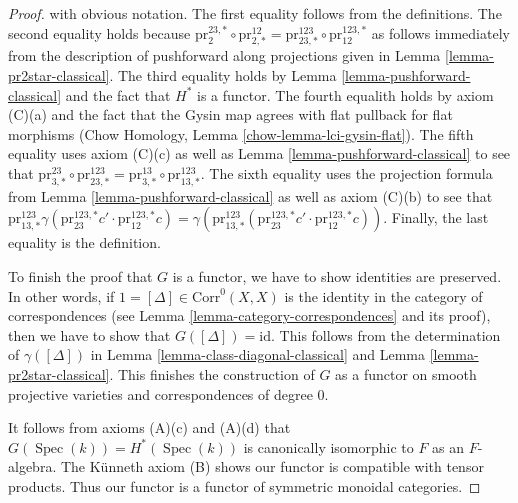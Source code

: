 \documentclass{stacks-project}
\theoremstyle{plain}
\theoremstyle{definition}
\theoremstyle{remark}
\numberwithin{equation}{subsection}
\def\Spec{\mathop{\mathrm{Spec}}}
\begin{document}
\begin{proof}
with obvious notation. The first equality follows from the definitions.
The second equality holds because
$\text{pr}^{23, *}_2 \circ \text{pr}^{12}_{2, *} =
\text{pr}^{123}_{23, *} \circ \text{pr}^{123, *}_{12}$
as follows immediately from the description of pushforward
along projections given in Lemma \ref{lemma-pr2star-classical}.
The third equality holds by Lemma \ref{lemma-pushforward-classical}
and the fact that $H^*$ is a functor.
The fourth equalith holds by axiom (C)(a) and the fact that
the Gysin map agrees with flat pullback for flat morphisms
(Chow Homology, Lemma \ref{chow-lemma-lci-gysin-flat}).
The fifth equality uses axiom (C)(c) as well as
Lemma \ref{lemma-pushforward-classical} to see that
$\text{pr}^{23}_{3, *} \circ \text{pr}^{123}_{23, *} =
\text{pr}^{13}_{3, *} \circ \text{pr}^{123}_{13, *}$.
The sixth equality uses the projection formula from
Lemma \ref{lemma-pushforward-classical} as well as
axiom (C)(b) to see that $
\text{pr}^{123}_{13, *}
\gamma(\text{pr}^{123, *}_{23}c' \cdot \text{pr}^{123, *}_{12}c) =
\gamma(\text{pr}^{123}_{13, *}(
\text{pr}^{123, *}_{23}c' \cdot \text{pr}^{123, *}_{12}c))$.
Finally, the last equality is the definition.

\medskip\noindent
To finish the proof that $G$ is a functor,
we have to show identities are preserved. In other words, if
$1 = [\Delta] \in \text{Corr}^0(X, X)$ is the identity
in the category of correspondences (see
Lemma \ref{lemma-category-correspondences} and its proof),
then we have to show that $G([\Delta]) = \text{id}$.
This follows from the determination of
$\gamma([\Delta])$ in Lemma \ref{lemma-class-diagonal-classical}
and Lemma \ref{lemma-pr2star-classical}.
This finishes the construction of $G$ as a functor on
smooth projective varieties and correspondences of degree $0$.

\medskip\noindent
It follows from axioms (A)(c) and (A)(d) that
$G(\Spec(k)) = H^*(\Spec(k))$ is canonically isomorphic to $F$
as an $F$-algebra.
The K\"unneth axiom (B) shows our functor is compatible with tensor products.
Thus our functor is a functor of symmetric monoidal categories.


\end{proof}
\end{document}
